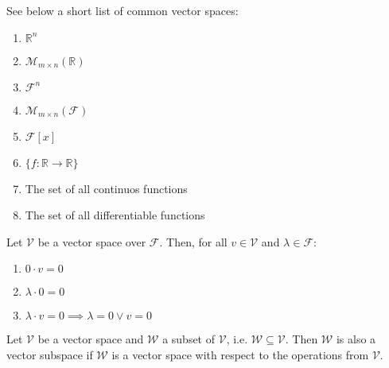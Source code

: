 \begin{exm}
	See below a short list of common vector spaces:
	\begin{enumerate}
		\item $\mathbb{R}^n$
		\item $\mathcal{M}_{m \times n}(\mathbb{R})$
		\item $\mathcal{F}^n$
		\item $\mathcal{M}_{m \times n}(\mathcal{F})$
		\item $\mathcal{F}[x]$
		\item $\{f:\mathbb{R}\rightarrow\mathbb{R}\}$
		\item The set of all continuos functions
		\item The set of all differentiable functions
	\end{enumerate}
\end{exm}

\begin{thm}\label{thm-zero-vector}
	Let $\mathcal{V}$ be a vector space over $\mathcal{F}$. Then,
	for all $ v \in\mathcal{V}$ and $\lambda\in\mathcal{F}$:
	\begin{enumerate}
		\item $0 \cdot v = 0$
		\item $\lambda\cdot 0 = 0$
		\item $\lambda\cdot v = 0 \implies \lambda=0 \lor v=0$
	\end{enumerate}
\end{thm}

\begin{definition}\label{def-vector-subspace}
	Let $\mathcal{V}$ be a vector space and $\mathcal{W}$ a subset of $\mathcal{V}$,
	i.e. $\mathcal{W}\subseteq\mathcal{V}$. Then $\mathcal{W}$ is also a vector
	subspace if $\mathcal{W}$ is a vector space with respect to the operations
	from $\mathcal{V}$.
\end{definition}

